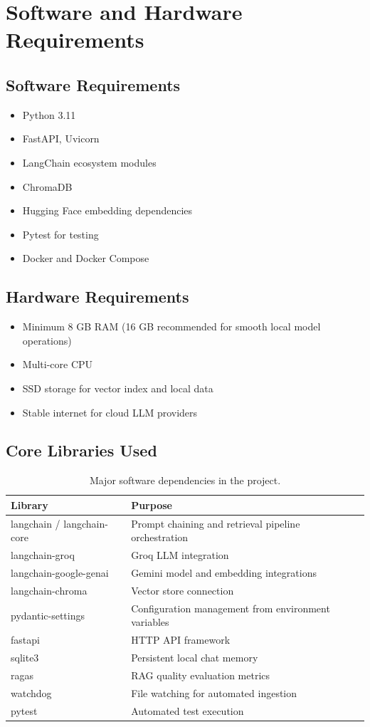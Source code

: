 \documentclass[12pt,letterpaper]{report}
\begin{document}
\section{Software and Hardware Requirements}
\subsection{Software Requirements}
\begin{itemize}
\item Python 3.11
\item FastAPI, Uvicorn
\item LangChain ecosystem modules
\item ChromaDB
\item Hugging Face embedding dependencies
\item Pytest for testing
\item Docker and Docker Compose
\end{itemize}

\subsection{Hardware Requirements}
\begin{itemize}
\item Minimum 8 GB RAM (16 GB recommended for smooth local model operations)
\item Multi-core CPU
\item SSD storage for vector index and local data
\item Stable internet for cloud LLM providers
\end{itemize}

\subsection{Core Libraries Used}
\begin{table}[h]
\centering
\begin{tabular}{p{}p{}}
\hline
\textbf{Library} & \textbf{Purpose} \\
\hline
langchain / langchain-core & Prompt chaining and retrieval pipeline orchestration \\
langchain-groq & Groq LLM integration \\
langchain-google-genai & Gemini model and embedding integrations \\
langchain-chroma & Vector store connection \\
pydantic-settings & Configuration management from environment variables \\
fastapi & HTTP API framework \\
sqlite3 & Persistent local chat memory \\
ragas & RAG quality evaluation metrics \\
watchdog & File watching for automated ingestion \\
pytest & Automated test execution \\
\hline
\end{tabular}
\caption{Major software dependencies in the project.}
\end{table}
\end{document}
